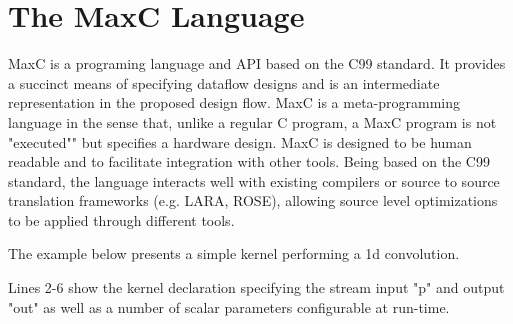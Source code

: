 \documentclass[conference]{IEEEtran}
\begin{document}
%




\section{The  MaxC Language}

MaxC is a programing language and API based on the C99 standard. It
provides a succinct means of specifying dataflow designs and is an
intermediate representation in the proposed design flow. MaxC is a
meta-programming language in the sense that, unlike a regular C
program, a MaxC program is not "executed"" but specifies
a hardware design. MaxC is designed to be human readable and to
facilitate integration with other tools. Being based on the C99
standard, the language interacts well with existing compilers or source
to source translation frameworks (e.g. LARA, ROSE), allowing source
level optimizations to be applied through different tools.

The example below presents a simple kernel performing a 1d
convolution.

Lines 2-6 show the kernel declaration specifying the stream input "p"
and output "out" as well as a number of scalar parameters configurable
at run-time.
\end{document}
